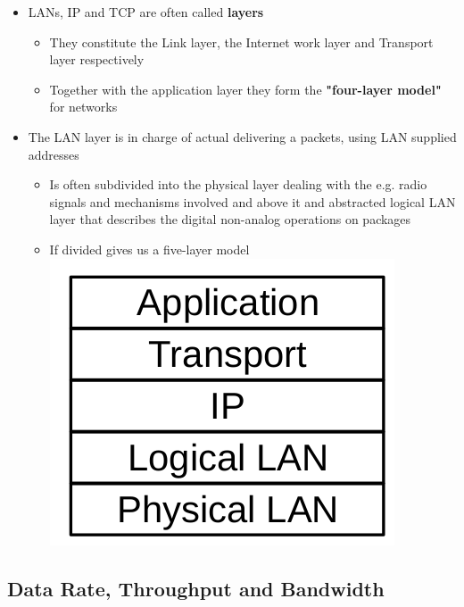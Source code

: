 \documentclass[11pt]{article}
\makeatletter
\def\maxwidth{\ifdim\Gin@nat@width>\linewidth\linewidth
    \else\Gin@nat@width\fi}
\let\Oldincludegraphics\includegraphics
\renewcommand{\includegraphics}[1]{\Oldincludegraphics[width=.8\maxwidth]{#1}}
\providecommand{\tightlist}{%
      \setlength{\itemsep}{0pt}\setlength{\parskip}{0pt}}
\makeatother
\begin{document}
\begin{itemize}
\tightlist
\item
  LANs, IP and TCP are often called \textbf{layers}

  \begin{itemize}
  \tightlist
  \item
    They constitute the Link layer, the Internet work layer and
    Transport layer respectively
  \item
    Together with the application layer they form the
    \textbf{"four-layer model"} for networks
  \end{itemize}
\item
  The LAN layer is in charge of actual delivering a packets, using LAN
  supplied addresses

  \begin{itemize}
  \tightlist
  \item
    Is often subdivided into the physical layer dealing with the e.g.
    radio signals and mechanisms involved and above it and abstracted
    logical LAN layer that describes the digital non-analog operations
    on packages
  \item
    If divided gives us a five-layer model
    \includegraphics{img/network_layers.png}
  \end{itemize}
\end{itemize}

    \subsection{Data Rate, Throughput and
Bandwidth}\label{data-rate-throughput-and-bandwidth}
\end{document}
